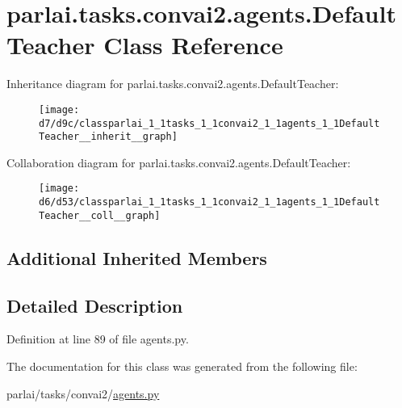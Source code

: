 \hypertarget{classparlai_1_1tasks_1_1convai2_1_1agents_1_1DefaultTeacher}{}\section{parlai.\+tasks.\+convai2.\+agents.\+Default\+Teacher Class Reference}
\label{classparlai_1_1tasks_1_1convai2_1_1agents_1_1DefaultTeacher}


Inheritance diagram for parlai.\+tasks.\+convai2.\+agents.\+Default\+Teacher\+:\nopagebreak
\begin{figure}[H]
\begin{center}
\leavevmode
\texttt{[image: d7/d9c/classparlai\_1\_1tasks\_1\_1convai2\_1\_1agents\_1\_1DefaultTeacher\_\_inherit\_\_graph]}
\end{center}
\end{figure}


Collaboration diagram for parlai.\+tasks.\+convai2.\+agents.\+Default\+Teacher\+:\nopagebreak
\begin{figure}[H]
\begin{center}
\leavevmode
\texttt{[image: d6/d53/classparlai\_1\_1tasks\_1\_1convai2\_1\_1agents\_1\_1DefaultTeacher\_\_coll\_\_graph]}
\end{center}
\end{figure}
\subsection*{Additional Inherited Members}


\subsection{Detailed Description}


Definition at line 89 of file agents.\+py.



The documentation for this class was generated from the following file\+:\begin{DoxyCompactItemize}
\item 
parlai/tasks/convai2/\hyperlink{parlai_2tasks_2convai2_2agents_8py}{agents.\+py}\end{DoxyCompactItemize}

